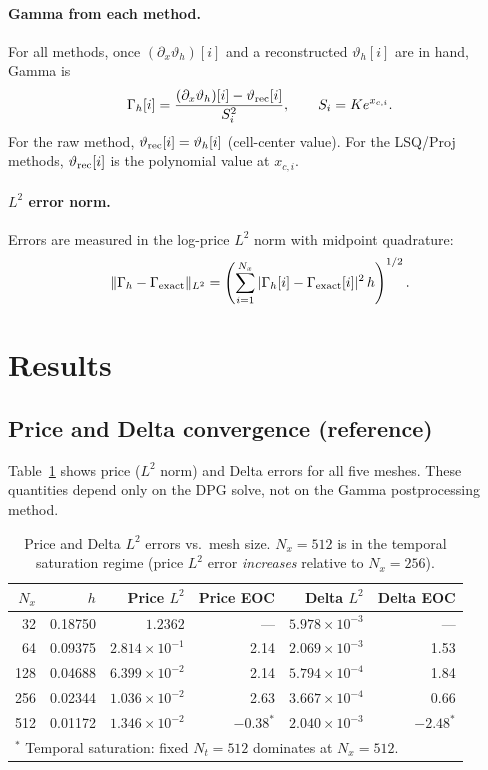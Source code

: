 \documentclass[11pt,a4paper]{article}
\newcommand{\Nx}{N_x}
\newcommand{\vth}{\vartheta}
\begin{document}
\paragraph{Gamma from each method.}
For all methods, once $(\partial_x\vth_h)[i]$ and a reconstructed
$\vth_h[i]$ are in hand, Gamma is
\[
  \Gamma_h[i] = \frac{(\partial_x\vth_h)[i] - \vth_{\rm rec}[i]}{S_i^2},
  \qquad S_i = K e^{x_{c,i}}.
\]
For the raw method, $\vth_{\rm rec}[i] = \vth_h[i]$ (cell-center value).
For the LSQ/Proj methods, $\vth_{\rm rec}[i]$ is the polynomial value
at $x_{c,i}$.

\paragraph{$L^2$ error norm.}
Errors are measured in the log-price $L^2$ norm with midpoint quadrature:
\[
  \|\Gamma_h - \Gamma_{\rm exact}\|_{L^2}
  = \left(\sum_{i=1}^{N_x} |\Gamma_h[i] - \Gamma_{\rm exact}[i]|^2\,h\right)^{1/2}.
\]

\section{Results}

\subsection{Price and Delta convergence (reference)}

Table~\ref{tab:price-delta} shows price ($L^2$ norm) and Delta errors
for all five meshes.  These quantities depend only on the DPG solve, not
on the Gamma postprocessing method.

\begin{table}[htbp]
\centering
\caption{Price and Delta $L^2$ errors vs.\ mesh size.
         $\Nx = 512$ is in the temporal saturation regime
         (price $L^2$ error \emph{increases} relative to $\Nx=256$).}
\label{tab:price-delta}
\begin{tabular}{rrrrrr}
\toprule
$\Nx$ & $h$ & Price $L^2$ & Price EOC & Delta $L^2$ & Delta EOC \\
\midrule
  32 & 0.18750 & $1.2362$ & ---  & $5.978\times10^{-3}$ & ---  \\
  64 & 0.09375 & $2.814\times10^{-1}$ & 2.14 & $2.069\times10^{-3}$ & 1.53 \\
 128 & 0.04688 & $6.399\times10^{-2}$ & 2.14 & $5.794\times10^{-4}$ & 1.84 \\
 256 & 0.02344 & $1.036\times10^{-2}$ & 2.63 & $3.667\times10^{-4}$ & 0.66 \\
 512 & 0.01172 & $1.346\times10^{-2}$ & $-0.38^*$ & $2.040\times10^{-3}$ & $-2.48^*$ \\
\bottomrule
\multicolumn{6}{l}{\footnotesize ${}^*$ Temporal saturation: fixed $N_t=512$ dominates at $\Nx=512$.}
\end{tabular}
\end{table}
\end{document}
